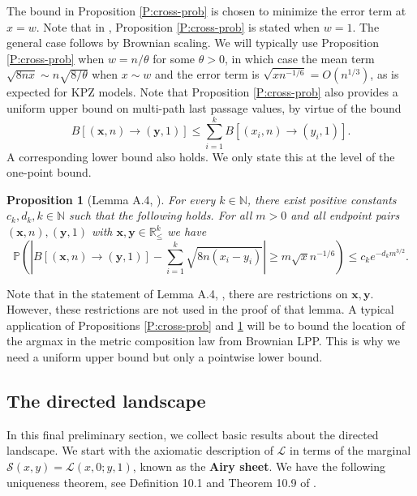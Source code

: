 \documentclass[11pt]{article}
\newcommand{\N}{\mathbb{N}}
\newcommand{\R}{\mathbb{R}}
\newcommand{\cL}{\mathcal{L}}
\newcommand{\cS}{\mathcal{S}}
\newcommand{\bx}{\mathbf{x}}
\newcommand{\by}{\mathbf{y}}
\newtheorem{proposition}[theorem]{Proposition}
\theoremstyle{definition} %
\theoremstyle{remark} %
\begin{document}
The bound in Proposition \ref{P:cross-prob} is chosen to minimize the error term at $x = w$. Note that in \cite{dauvergne2021bulk}, Proposition \ref{P:cross-prob} is stated when $w = 1$. The general case follows by Brownian scaling. We will typically use Proposition \ref{P:cross-prob} when $w = n/\theta$ for some $\theta > 0$, in which case the mean term $\sqrt{8 n x} \sim n \sqrt{8/\theta}$ when $x \sim w$  and the error term is $\sqrt{x n^{-1/6}} = O(n^{1/3})$, as is expected for KPZ models. Note that Proposition \ref{P:cross-prob} also provides a uniform upper bound on multi-path last passage values, by virtue of the bound
$$
B[(\bx, n) \to (\by, 1)] \le \sum_{i=1}^k B[(x_i, n) \to (y_i, 1)].
$$
A corresponding lower bound also holds. We only state this at the level of the one-point bound. 
\begin{proposition}[Lemma A.4, \cite{dauvergne2021disjoint}]
	\label{P:top-bd}
	For every $k \in \N$, there exist positive constants $c_k, d_k, k \in \N$ such that the following holds. For all $m > 0$ and all endpoint pairs $(\bx, n), (\by, 1)$ with $\bx, \by \in \R^k_\le$ we have
	\[
	\mathbb P\left (|B[(\bx, n) \to (\by, 1)] - \sum_{i=1}^k \sqrt{8 n (x_i - y_i)}| \ge m \sqrt{x} n^{-1/6} \right ) \le c_k e^{-d_k m^{3/2}}.
	\]
\end{proposition}
Note that in the statement of Lemma A.4, \cite{dauvergne2021bulk}, there are restrictions on $\bx, \by$. However, these restrictions are not used in the proof of that lemma. A typical application of Propositions \ref{P:cross-prob} and \ref{P:top-bd} will be to bound the location of the argmax in the metric composition law from Brownian LPP. This is why we need a uniform upper bound but only a pointwise lower bound.

\subsection{The directed landscape}

In this final preliminary section, we collect basic results about the directed landscape. We start with the axiomatic description of $\cL$ in terms of the marginal $\cS(x,y)=\cL(x,0;y,1)$, known as the \textbf{Airy sheet}. We have the following uniqueness theorem, see Definition 10.1 and Theorem 10.9 of \cite{DOV}.
\end{document}
